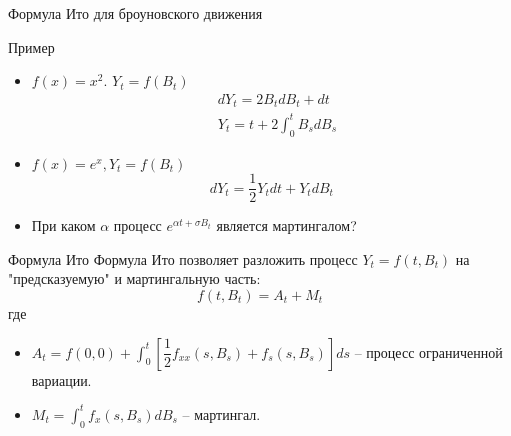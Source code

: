 \documentclass[aspectratio=169]{beamer}
\begin{document}
\begin{frame}{Формула Ито для броуновского движения}
     
\end{frame}

\begin{frame}{Пример}

\begin{itemize}
    \item $f(x) =x^2$. $Y_t = f(B_t)$
    \begin{align*}
        &dY_t = 2 B_t dB_t + dt  \\
        &Y_t = t + 2 \int_0^t B_s dB_s
    \end{align*}
    \item $f(x) = e^{x}, Y_t = f(B_t)$
    $$
        dY_t = \dfrac{1}{2}Y_t dt + Y_t dB_t
    $$
    \item При каком $\alpha$ процесс $e^{\alpha t + \sigma B_t}$ является мартингалом? 
\end{itemize}
\end{frame}

\begin{frame}{Формула Ито}
Формула Ито позволяет разложить процесс $Y_t = f(t, B_t)$ на "предсказуемую" и мартингальную часть:
$$
    f(t, B_t) = A_t + M_t
$$где 
\begin{itemize}
    \item $A_t = f(0, 0) + \int_0^t \left[\dfrac{1}{2}f_{xx}(s, B_s) + f_s(s, B_s)\right] ds$ -- процесс ограниченной вариации.
    \item $M_t = \int_0^t f_x(s, B_s) dB_s$ -- мартингал.
\end{itemize}
\end{frame}
\end{document}
